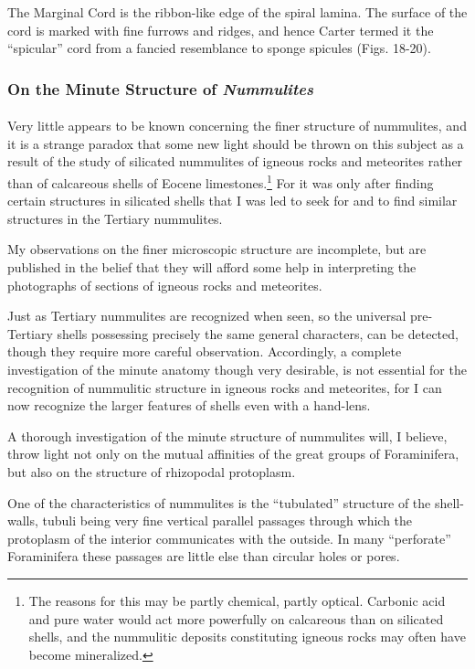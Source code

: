 \documentclass[a4paper, 12pt, oneside]{article}
\begin{document}
The Marginal Cord is the ribbon-like edge of the spiral lamina. The surface of the cord is marked with fine furrows and ridges, and hence Carter termed it the ``spicular'' cord from a fancied resemblance to sponge spicules (Figs. 18-20).

\subsubsection{On the Minute Structure of \emph{Nummulites}}
\paragraph{}
Very little appears to be known concerning the finer structure of nummulites, and it is a strange paradox that some new light should be thrown on this subject as a result of the study of silicated nummulites of igneous rocks and meteorites rather than of calcareous shells of Eocene limestones.\footnote{The reasons for this may be partly chemical, partly optical. Carbonic acid and pure water would act more powerfully on calcareous than on silicated shells, and the nummulitic deposits constituting igneous rocks may often have become mineralized.} For it was only after finding certain structures in silicated shells that I was led to seek for and to find similar structures in the Tertiary nummulites.

My observations on the finer microscopic structure are incomplete, but are published in the belief that they will afford some help in interpreting the photographs of sections of igneous rocks and meteorites.

Just as Tertiary nummulites are recognized when seen, so the universal pre-Tertiary shells possessing precisely the same general characters, can be detected, though they require more careful observation. Accordingly, a complete investigation of the minute anatomy though very desirable, is not essential for the recognition of nummulitic structure in igneous rocks and meteorites, for I can now recognize the larger features of shells even with a hand-lens.

A thorough investigation of the minute structure of nummulites will, I believe, throw light not only on the mutual affinities of the great groups of Foraminifera, but also on the structure of rhizopodal protoplasm.

One of the characteristics of nummulites is the ``tubulated'' structure of the shell-walls, tubuli being very fine vertical parallel passages through which the protoplasm of the interior communicates with the outside. In many ``perforate'' Foraminifera these passages are little else than circular holes or pores.
\end{document}
